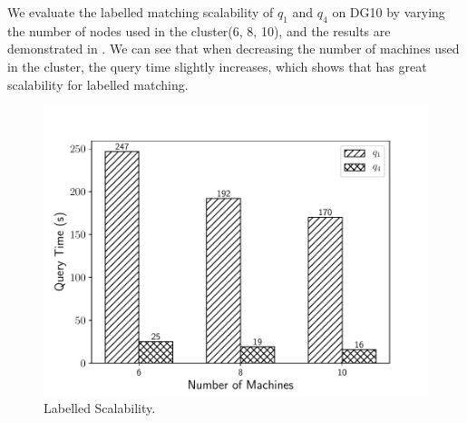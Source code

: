  We evaluate the labelled matching scalability of $q_1$ and $q_4$ on DG10 by varying the number of nodes used in the cluster(6, 8, 10), and the results are demonstrated in . We can see that when decreasing the number of machines used in the cluster, the query time slightly increases, which shows that \gencliqjoin has great scalability for labelled matching.

\begin{figure}[htb]
  \centering
  \includegraphics[scale=0.4]{figures/exp5.pdf}
  \caption{\small{Labelled Scalability.}}
  \label{fig:l_sca}
\end{figure}